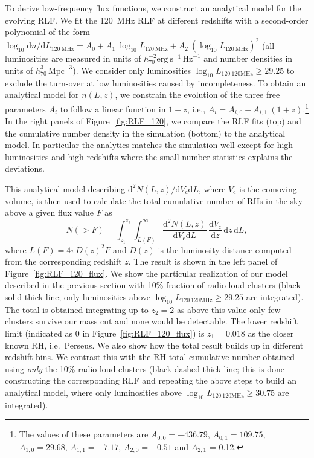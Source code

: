 \documentclass[traditabstract]{aa}
\newcommand{\rmn}{\mathrm}
\begin{document}
To derive low-frequency flux functions, we construct an analytical model for the
evolving RLF. We fit the 120~MHz RLF at different redshifts with a second-order
polynomial of the form $\log_{10} \rmn{d}n/\rmn{d}L_{120~\rmn{MHz}} = A_{0} +
A_{1}~\log_{10} L_{120~\rmn{MHz}} + A_{2}~(\log_{10} L_{120~\rmn{MHz}})^{2}$
(all luminosities are measured in units of $h_{70}^{-2}
\rmn{erg~s}^{-1}\,\rmn{Hz}^{-1}$ and number densities in units of
$h_{70}^{3}\,\rmn{Mpc}^{-3}$). We consider only luminosities $\log_{10}
L_{120~\rmn{120MHz}} \geq 29.25$ to exclude the turn-over at low luminosities
caused by incompleteness. To obtain an analytical model for $n(L,z)$, we
constrain the evolution of the three free parameters $A_i$ to follow a linear
function in $1+z$, i.e., $A_{i} = A_{i,0} + A_{i,1}~(1+z)$.\footnote{The values
  of these parameters are $A_{0,0} = -436.79$, $A_{0,1} = 109.75$, $A_{1,0} =
  29.68$, $A_{1,1} = -7.17$, $A_{2,0} = -0.51$ and $A_{2,1}$ = 0.12.} In the
right panels of Figure~\ref{fig:RLF_120}, we compare the RLF fits (top) and the
cumulative number density in the simulation (bottom) to the analytical model. In
particular the analytics matches the simulation well except for high luminosities
and high redshifts where the small number statistics explains the deviations.

This analytical model describing $\rmn{d}^2N(L,z)/\rmn{d}V_{\rmn{c}}\rmn{d}L$, where $V_{\rmn{c}}$ is the comoving volume, is then used to calculate the total cumulative number of RHs in the sky above a given flux value $F$ as
%
\begin{equation}
N(>F)  =  \int_{z_1}^{z_2} \int_{L(F)}^{\infty} \frac{\rmn{d}^2N(L,z)}{\rmn{d}V_{\rmn{c}}\rmn{d}L}\,
\frac{\rmn{d}V_{\rmn{c}}}{\rmn{d}z}\, \rmn{d}z\, \rmn{d}L ,
\label{eq:NtotRH}
\end{equation}
%
where $L(F) = 4 \pi D(z)^2 F$ and $D(z)$ is the luminosity distance computed from the corresponding redshift $z$.
The result is shown in the left panel of Figure~\ref{fig:RLF_120_flux}. We show the particular realization of our model described in the previous section with 10\% fraction of radio-loud clusters (black solid thick line; only luminosities above $\log_{10} L_{120~\rmn{120MHz}} \geq 29.25$ are integrated). The total is obtained integrating up to $z_{2} = 2$ as above this value only few clusters survive our mass cut and none would be detectable. The lower redshift limit (indicated as 0 in Figure~\ref{fig:RLF_120_flux}) is $z_{1} = 0.018$ as the closer known RH, i.e.~Perseus. We also show how the total result builds up in different redshift bins. We contrast this with the RH total cumulative number obtained using \emph{only} the 10\% radio-loud clusters (black dashed thick line; this is done constructing the corresponding RLF and repeating the above steps to build an analytical model, where only luminosities above $\log_{10} L_{120~\rmn{120MHz}} \geq 30.75$ are integrated). 
\end{document}
